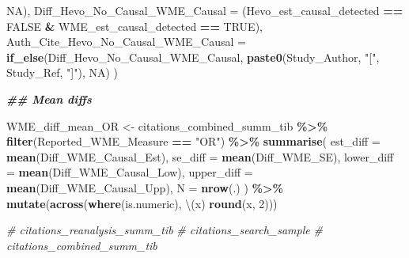 \documentclass[
]{article}
\newenvironment{Shaded}{\begin{snugshade}}{\end{snugshade}}
\newcommand{\AttributeTok}[1]{\textcolor[rgb]{0.13,0.29,0.53}{#1}}
\newcommand{\CommentTok}[1]{\textcolor[rgb]{0.56,0.35,0.01}{\textit{#1}}}
\newcommand{\ConstantTok}[1]{\textcolor[rgb]{0.56,0.35,0.01}{#1}}
\newcommand{\DecValTok}[1]{\textcolor[rgb]{0.00,0.00,0.81}{#1}}
\newcommand{\DocumentationTok}[1]{\textcolor[rgb]{0.56,0.35,0.01}{\textbf{\textit{#1}}}}
\newcommand{\FunctionTok}[1]{\textcolor[rgb]{0.13,0.29,0.53}{\textbf{#1}}}
\newcommand{\NormalTok}[1]{#1}
\newcommand{\OtherTok}[1]{\textcolor[rgb]{0.56,0.35,0.01}{#1}}
\newcommand{\SpecialCharTok}[1]{\textcolor[rgb]{0.81,0.36,0.00}{\textbf{#1}}}
\newcommand{\StringTok}[1]{\textcolor[rgb]{0.31,0.60,0.02}{#1}}
\begin{document}
\begin{Shaded}
\begin{Highlighting}[]
                                                  \ConstantTok{NA}\NormalTok{),}
    \AttributeTok{Diff\_Hevo\_No\_Causal\_WME\_Causal =}\NormalTok{ (Hevo\_est\_causal\_detected }\SpecialCharTok{==} \ConstantTok{FALSE} \SpecialCharTok{\&}\NormalTok{ WME\_est\_causal\_detected }\SpecialCharTok{==} \ConstantTok{TRUE}\NormalTok{),}
    \AttributeTok{Auth\_Cite\_Hevo\_No\_Causal\_WME\_Causal =} \FunctionTok{if\_else}\NormalTok{(Diff\_Hevo\_No\_Causal\_WME\_Causal,}
                                                  \FunctionTok{paste0}\NormalTok{(Study\_Author, }\StringTok{"["}\NormalTok{, Study\_Ref, }\StringTok{"]"}\NormalTok{),}
                                                  \ConstantTok{NA}\NormalTok{)}
\NormalTok{  )}

\DocumentationTok{\#\# Mean diffs}

\NormalTok{WME\_diff\_mean\_OR }\OtherTok{\textless{}{-}}\NormalTok{ citations\_combined\_summ\_tib }\SpecialCharTok{\%\textgreater{}\%} 
  \FunctionTok{filter}\NormalTok{(Reported\_WME\_Measure }\SpecialCharTok{==} \StringTok{"OR"}\NormalTok{) }\SpecialCharTok{\%\textgreater{}\%}
  \FunctionTok{summarise}\NormalTok{(}
    \AttributeTok{est\_diff =} \FunctionTok{mean}\NormalTok{(Diff\_WME\_Causal\_Est),}
    \AttributeTok{se\_diff =} \FunctionTok{mean}\NormalTok{(Diff\_WME\_SE),}
    \AttributeTok{lower\_diff =} \FunctionTok{mean}\NormalTok{(Diff\_WME\_Causal\_Low),}
    \AttributeTok{upper\_diff =} \FunctionTok{mean}\NormalTok{(Diff\_WME\_Causal\_Upp),}
    \AttributeTok{N =} \FunctionTok{nrow}\NormalTok{(.)}
\NormalTok{  ) }\SpecialCharTok{\%\textgreater{}\%} 
  \FunctionTok{mutate}\NormalTok{(}\FunctionTok{across}\NormalTok{(}\FunctionTok{where}\NormalTok{(is.numeric), \textbackslash{}(x) }\FunctionTok{round}\NormalTok{(x, }\DecValTok{2}\NormalTok{)))}







\CommentTok{\# citations\_reanalysis\_summ\_tib}
\CommentTok{\# citations\_search\_sample}
\CommentTok{\# citations\_combined\_summ\_tib}
\end{Highlighting}
\end{Shaded}
\end{document}
